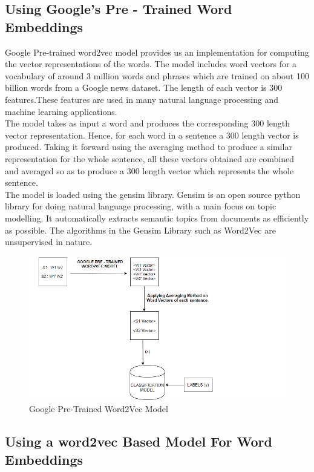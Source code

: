 \documentclass[a4paper,11pt]{article}
\begin{document}
\subsection{Using Google's Pre - Trained Word Embeddings}

Google Pre-trained word2vec model\cite{mikolov2013distributed} provides us an implementation for computing the vector representations of the words. The model includes word vectors for a vocabulary of around 3 million words and phrases which are trained on about 100 billion words from a Google news dataset. The length of each vector is 300 features.These features are used in many natural language processing and machine learning applications.
\medskip\\
The model takes as input a word and produces the corresponding 300 length vector representation. Hence, for each word in a sentence a 300 length vector is produced. Taking it forward using the averaging method to produce a similar representation for the whole sentence, all these vectors obtained are combined and averaged so as to produce a 300 length vector which represents the whole sentence.
\medskip\\
The model is loaded using the gensim library. Gensim is an open source python library for doing natural language processing, with a main focus on topic modelling. It automatically extracts semantic topics from documents as efficiently as possible. The algorithms in the Gensim Library such as Word2Vec\cite{mikolov2013efficient} are unsupervised in nature.
\medskip\\
\begin{figure}[ht]
    \centering
    \includegraphics[width=20cm]{GooglePre-Trained.png}
    \caption{Google Pre-Trained Word2Vec Model}
    \label{fig:my_label}
\end{figure}
\newpage
\subsection{Using a word2vec Based Model For Word Embeddings}
\end{document}
